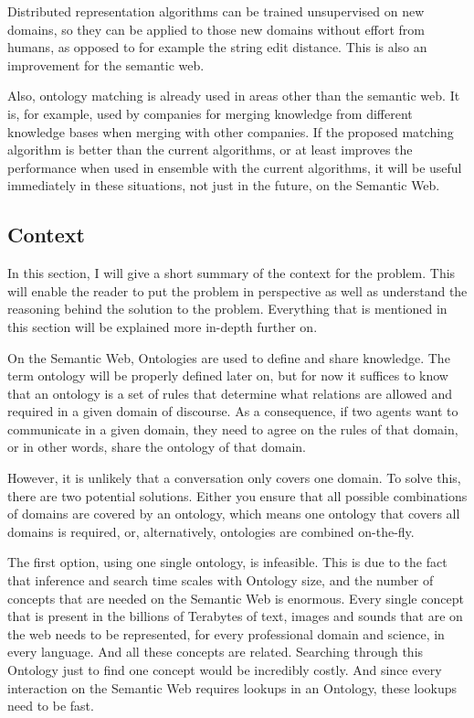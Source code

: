 \documentclass{article}
\begin{document}
 Distributed representation algorithms can be trained unsupervised on new domains, so they can be applied to those new domains without effort from humans, as opposed to for example the string edit distance. This is also an improvement for the semantic web.
 
 Also, ontology matching is already used in areas other than the semantic web. It is, for example, used by companies for merging knowledge from different knowledge bases when merging with other companies. If the proposed matching algorithm is better than the current algorithms, or at least improves the performance when used in ensemble with the current algorithms, it will be useful immediately in these situations, not just in the future, on the Semantic Web.

 \subsection{Context}
 In this section, I will give a short summary of the context for the problem. This will enable the reader to put the problem in perspective as well as understand the reasoning behind the solution to the problem. Everything that is mentioned in this section will be explained more in-depth further on.
 
 On the Semantic Web, Ontologies are used to define and share knowledge. The term ontology will be properly defined later on, but for now it suffices to know that an ontology is a set of rules that determine what relations are allowed and required in a given domain of discourse. As a consequence, if two agents want to communicate in a given domain, they need to agree on the rules of that domain, or in other words, share the ontology of that domain.
 
 However, it is unlikely that a conversation only covers one domain. To solve this, there are two potential solutions. Either you ensure that all possible combinations of domains are covered by an ontology, which means one ontology that covers all domains is required, or, alternatively, ontologies are combined on-the-fly.
 
 The first option, using one single ontology, is infeasible. This is due to the fact that inference and search time scales with Ontology size, and the number of concepts that are needed on the Semantic Web is enormous. Every single concept that is present in the billions of Terabytes of text, images and sounds that are on the web needs to be represented, for every professional domain and science, in every language. And all these concepts are related. Searching through this Ontology just to find one concept would be incredibly costly. And since every interaction on the Semantic Web requires lookups in an Ontology, these lookups need to be fast.
 
\end{document}
